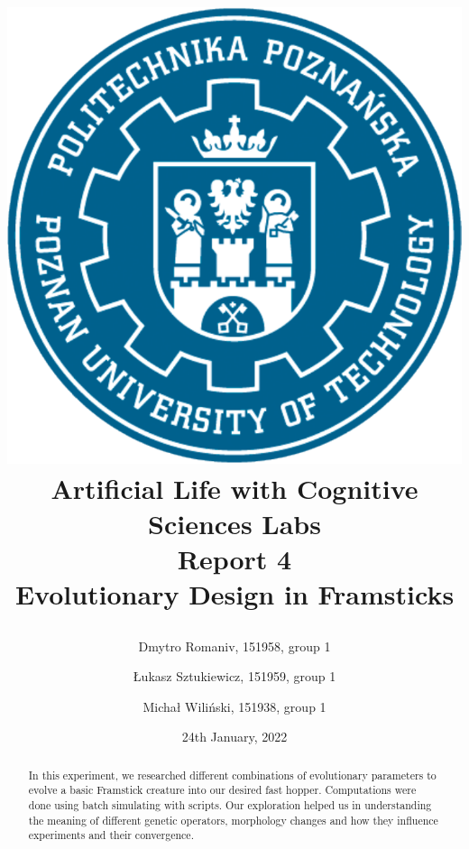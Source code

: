 \documentclass[a4]{article}
\begin{document}
\graphicspath{ {./res/} }

\begin{titlepage}


\date{24th January, 2022}
\title
{
\begin{center}
	\includegraphics[scale=0.4]{logo}\\
	\Huge Artificial Life with Cognitive Sciences Labs\\		
	\Large \vspace{5mm} Report 4\\
	\large \smallskip Evolutionary Design in Framsticks
	\pagenumbering{}
\end{center}
}
\author{Dmytro Romaniv, 151958, group 1 \and Łukasz Sztukiewicz, 151959, group 1 \and Michał Wiliński, 151938, group 1}
\maketitle
\vspace*{\fill}
\begin{abstract}
In this experiment, we researched different combinations of evolutionary parameters to evolve a basic Framstick creature into our desired fast hopper. Computations were done using batch simulating with scripts. Our exploration helped us in understanding the meaning of different genetic operators, morphology changes and how they influence experiments and their convergence. 
\end{abstract}
\end{titlepage}
\tableofcontents
\end{document}
